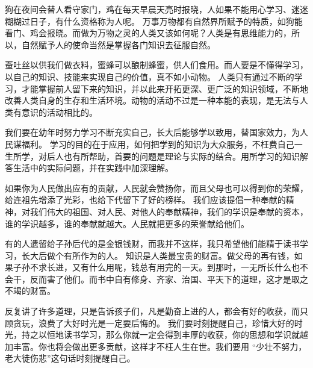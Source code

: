\documentclass[avery5371,grid]{flashcards}
\begin{document}
{狗在夜间会替人看守家门，鸡在每天早晨天亮时报晓，人如果不能用心学习、迷迷糊糊过日子，有什么资格称为人呢。} %
{万事万物都有自然界所赋予的特质，如狗能看门、鸡会报晓。而做为万物之灵的人类又该如何呢？人类是有思维能力的，所以，自然赋予人的使命当然是掌握各门知识去征服自然。} %

{蚕吐丝以供我们做衣料，蜜蜂可以酿制蜂蜜，供人们食用。而人要是不懂得学习，以自己的知识、技能来实现自己的价值，真不如小动物。} %
{人类只有通过不断的学习，才能掌握前人留下来的知识，并以此来开拓更深、更广泛的知识领域，不断地改善人类自身的生存和生活环境。动物的活动不过是一种本能的表现，是无法与人类有意识的活动相比的。} %

{我们要在幼年时努力学习不断充实自己，长大后能够学以致用，替国家效力，为人民谋福利。} %
{学习的目的在于应用，如何把学到的知识为大众服务，不枉费自己一生所学，对后人也有所帮助，首要的问题是理论与实际的结合。用所学习的知识解答生活中的实际问题，并在实践中加深理解。} %

{如果你为人民做出应有的贡献，人民就会赞扬你，而且父母也可以得到你的荣耀，给连祖先增添了光彩，也给下代留下了好的榜样。} %
{我们应该提倡一种奉献的精神，对我们伟大的祖国、对人民、对他人的奉献精神，我们的学识是奉献的资本，谁的学识越多，谁的奉献就越大。人民就把更多的荣誉献给他们。} %

{有的人遗留给子孙后代的是金银钱财，而我并不这样，我只希望他们能精于读书学习，长大后做个有所作为的人。} %
{知识是人类最宝贵的财富。做父母的再有钱，如果子孙不求长进，又有什么用呢，钱总有用完的一天。到那时，一无所长什么也不会干，反而害了他们。而书中自有修身、齐家、治国、平天下的道理，这才是取之不竭的财富。} %

{反复讲了许多道理，只是告诉孩子们，凡是勤奋上进的人，都会有好的收获，而只顾贪玩，浪费了大好时光是一定要后悔的。} %
{我们要时刻提醒自己，珍惜大好的时光，持之以恒地读书学习，那么你就一定会得到丰厚的收获，你的思想和学识就越加丰富。你也将会做出更多贡献，这样才不枉人生在世。我们要用 “少壮不努力，老大徒伤悲”这句话时刻提醒自己。} %



\end{document}
